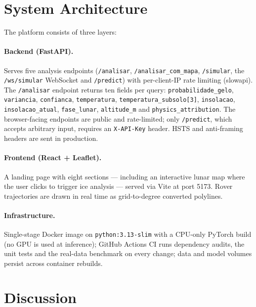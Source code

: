 \documentclass[12pt,a4paper]{article}
\begin{document}
\section{System Architecture}

The platform consists of three layers:

\paragraph{Backend (FastAPI).} Serves five analysis endpoints
(\texttt{/analisar}, \texttt{/analisar\_com\_mapa}, \texttt{/simular}, the
\texttt{/ws/simular} WebSocket and \texttt{/predict}) with per-client-IP rate
limiting (slowapi). The \texttt{/analisar} endpoint returns ten fields per query:
\texttt{probabilidade\_gelo}, \texttt{variancia}, \texttt{confianca},
\texttt{temperatura}, \texttt{temperatura\_subsolo[3]}, \texttt{insolacao},
\texttt{insolacao\_atual}, \texttt{fase\_lunar}, \texttt{altitude\_m} and
\texttt{physics\_attribution}. The browser-facing endpoints are public and
rate-limited; only \texttt{/predict}, which accepts arbitrary input, requires an
\texttt{X-API-Key} header. HSTS and anti-framing headers are sent in production.

\paragraph{Frontend (React + Leaflet).} A landing page with eight sections —
including an interactive lunar map where the user clicks to trigger ice analysis —
served via Vite at port 5173. Rover trajectories are drawn in real time as
grid-to-degree converted polylines.

\paragraph{Infrastructure.} Single-stage Docker image on
\texttt{python:3.13-slim} with a CPU-only PyTorch build (no GPU is used at
inference); GitHub Actions CI runs dependency audits, the unit tests and the
real-data benchmark on every change; data and model volumes persist across
container rebuilds.

\section{Discussion}
\end{document}
